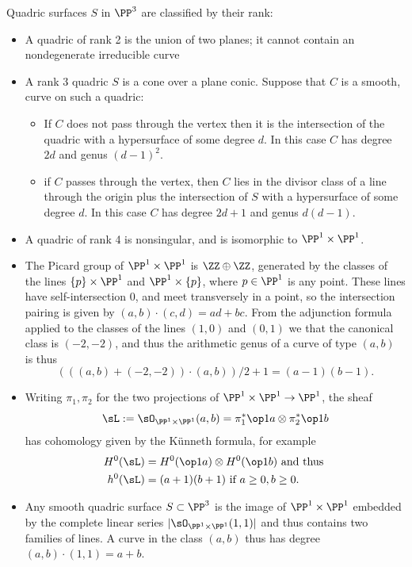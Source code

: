 \begin{example}[Quadrics in $\PP^3$]\label{Div of quadric}
 
Quadric surfaces $S$ in $\PP^3$ are classified by their rank:
\begin{itemize}
\item A quadric of rank 2 is the union of two planes; it cannot contain an nondegenerate irreducible curve
\item A rank 3 quadric $S$ is a cone over a plane conic. Suppose that $C$ is a smooth,
curve on such a quadric:
\begin{itemize}
\item  If $C$  does
not pass through the vertex then it is the intersection of the quadric with a hypersurface of some
degree $d$. In this case $C$ has degree $2d$ and genus $(d-1)^2$. 
 \item if $C$ passes through the vertex, then $C$ lies in the divisor class of a line through the origin plus the intersection of $S$ with a hypersurface of some degree $d$. In this case $C$ has degree $2d+1$ and 
 genus $d(d-1)$. 
\end{itemize}


\item A quadric of rank 4 is nonsingular, and is isomorphic to $\PP^1\times \PP^1$.


\item The Picard group of $\PP^1\times \PP^1$ is $\ZZ\oplus \ZZ$, generated by the 
classes of the lines $\{p\}\times \PP^1$ and $\PP^1\times \{p\}$, where $p\in \PP^1$
is any point. These lines have self-intersection 0, and meet transversely in a point,
so the intersection pairing is given by $(a,b)\cdot(c,d) = ad+bc$. From the adjunction formula
applied to the classes of the lines $(1,0)$ and $(0,1)$ we that the canonical
class is $(-2,-2)$, and thus the arithmetic genus of a curve of type $(a,b)$ is thus
$$
\left(((a,b)+(-2,-2))\cdot (a,b)\right)/2 +1 = (a-1)(b-1).
$$

\item Writing $\pi_1, \pi_2$ for the two projections of
$\PP^1\times \PP^1 \to \PP^1$, the sheaf 
$$
\sL := \sO_{\PP^1\times \PP^1}(a,b) = \pi_1^*\op1a \otimes \pi_2^*\op1b
$$
has cohomology given by the K\"unneth formula, for example
\begin{align*}
 H^0(\sL) &= H^0(\op1a)\otimes H^0(\op1b) \hbox{ and thus }\\
 h^0(\sL) &= (a+1)(b+1) \hbox{ if } a\geq 0, b\geq 0.
\end{align*}

\item Any smooth quadric surface $S\subset \PP^3$ is the 
image of $\PP^1\times \PP^1$ embedded by the complete linear series
$|\sO_{\PP^1\times \PP^1}(1,1)|$ and thus contains two families of lines. 
A curve in the class $(a,b)$ thus has degree $(a,b)\cdot(1,1) = a+b$. 
\end{itemize}
\end{example}

